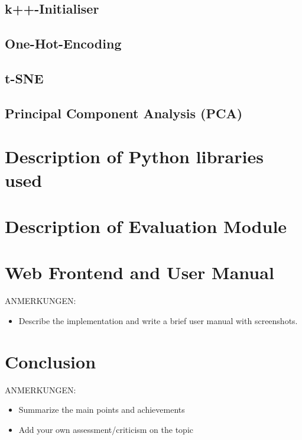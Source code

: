 \documentclass[12pt, english]
{article}
\begin{document}
\subsection{k++-Initialiser}
\subsection{One-Hot-Encoding}

\subsection{t-SNE}

\subsection{Principal Component Analysis (PCA)}



\section{Description of Python libraries used}


\section{Description of Evaluation Module}


\section{Web Frontend and User Manual}
ANMERKUNGEN:
\begin{itemize}
\item Describe the implementation and write a brief user manual with screenshots.
\end{itemize}

\section{Conclusion}
ANMERKUNGEN:
\begin{itemize}
\item Summarize the main points and achievements
\item Add your own assessment/criticism on the topic
\end{itemize}

\newpage

\printglossary[style=altlist,title=Glossary]
 
\printglossary[type=\acronymtype,style=long]
 
\printglossary[type=symbolslist,style=long]

\newpage




\nocite{*}
\end{document}
